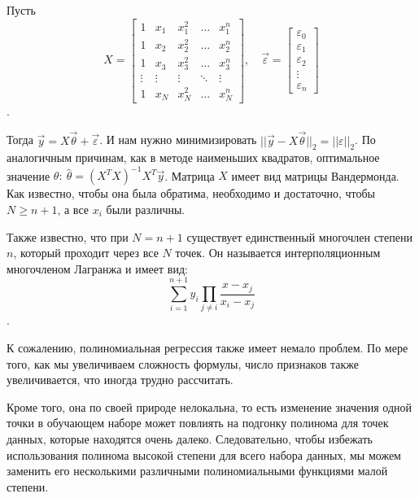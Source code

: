 Пусть $$X = {\begin{bmatrix}1&x_{1}&x_{1}^{2}&\dots &x_{1}^{n}\\1&x_{2}&x_{2}^{2}&\dots &x_{2}^{n}\\1&x_{3}&x_{3}^{2}&\dots &x_{3}^{n}\\\vdots &\vdots &\vdots &\ddots &\vdots \\1&x_{N}&x_{N}^{2}&\dots &x_{N}^{n}\end{bmatrix}}, \quad \vec{\varepsilon} = \begin{bmatrix}
\varepsilon _{0}\\\varepsilon _{1}\\\varepsilon _{2}\\\vdots \\\varepsilon _{n}
\end{bmatrix}$$.

Тогда $\vec{y}=X\vec{\theta}+\vec{\varepsilon}$. И нам нужно минимизировать $||\vec{y} - X\vec{\theta}||_2 = ||\varepsilon||_2$. По аналогичным причинам, как в методе наименьших квадратов, оптимальное значение $\theta:\ \hat{\theta} = (X^T X)^{-1} X^T \vec{y}$. Матрица $X$ имеет вид матрицы Вандермонда. Как известно, чтобы она была обратима, необходимо и достаточно, чтобы $N\geq n+1$, а все $x_i$ были различны.

Также известно, что при $N=n+1$ существует единственный многочлен степени $n$, который проходит через все $N$ точек. Он называется интерполяционным многочленом Лагранжа и имеет вид:
$$\sum\limits_{i=1}^{n+1} y_i \prod_{j\neq i}\frac{x-x_j}{x_i-x_j}$$.


К сожалению, полиномиальная регрессия также имеет немало проблем. По мере того, как мы увеличиваем сложность формулы, число признаков также увеличивается, что иногда трудно рассчитать.

Кроме того, она по своей природе нелокальна, то есть изменение значения одной точки в обучающем наборе может повлиять на подгонку полинома для точек данных, которые находятся очень далеко. Следовательно, чтобы избежать использования полинома высокой степени для всего набора данных, мы можем заменить его несколькими различными полиномиальными функциями малой степени.



